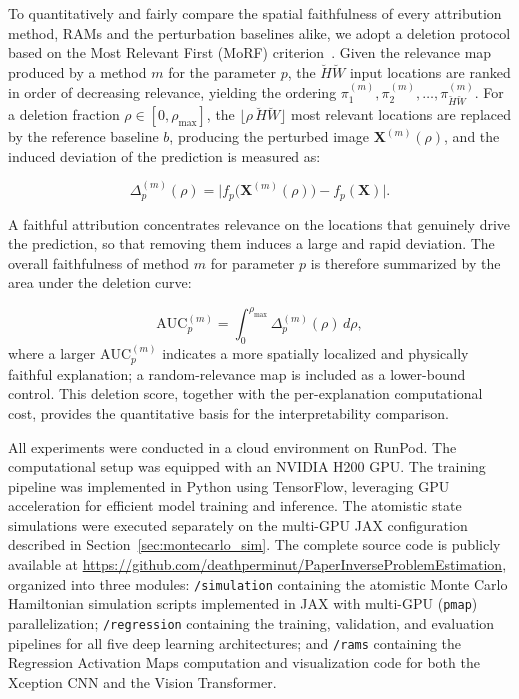 \documentclass[final,5p,times,twocolumn]{elsarticle}
\begin{document}
To quantitatively and fairly compare the spatial faithfulness of every attribution method, RAMs and the perturbation baselines alike, we adopt a deletion protocol based on the Most Relevant First (MoRF) criterion~\cite{samek2017evaluating}. Given the relevance map produced by a method $m$ for the parameter $p$, the $\breve{H}\breve{W}$ input locations are ranked in order of decreasing relevance, yielding the ordering $\pi_1^{(m)}, \pi_2^{(m)}, \dots, \pi_{\breve{H}\breve{W}}^{(m)}$. For a deletion fraction $\rho \in [0, \rho_{\max}]$, the $\lfloor \rho\,\breve{H}\breve{W} \rfloor$ most relevant locations are replaced by the reference baseline $b$, producing the perturbed image $\mathbf{X}^{(m)}(\rho)$, and the induced deviation of the prediction is measured as:

\begin{equation}\label{eq:deletion_dev}
\Delta_p^{(m)}(\rho) = \big| f_p\big(\mathbf{X}^{(m)}(\rho)\big) - f_p(\mathbf{X}) \big|.
\end{equation}

A faithful attribution concentrates relevance on the locations that genuinely drive the prediction, so that removing them induces a large and rapid deviation. The overall faithfulness of method $m$ for parameter $p$ is therefore summarized by the area under the deletion curve:

\begin{equation}\label{eq:deletion_auc}
\text{AUC}_p^{(m)} = \int_0^{\rho_{\max}} \Delta_p^{(m)}(\rho)\, d\rho,
\end{equation}
where a larger $\text{AUC}_p^{(m)}$ indicates a more spatially localized and physically faithful explanation; a random-relevance map is included as a lower-bound control. This deletion score, together with the per-explanation computational cost, provides the quantitative basis for the interpretability comparison.


All experiments were conducted in a cloud environment on RunPod. The computational 
setup was equipped with an NVIDIA H200 GPU. The training 
pipeline was implemented in Python using TensorFlow, 
leveraging GPU acceleration for efficient model training and inference. The atomistic state simulations were executed separately on the multi-GPU JAX configuration described in Section~\ref{sec:montecarlo_sim}. The complete source code 
is publicly available at 
\url{https://github.com/deathperminut/PaperInverseProblemEstimation}, 
organized into three modules: 
\texttt{/simulation} containing the atomistic 
Monte Carlo Hamiltonian simulation scripts 
implemented in JAX with multi-GPU (\texttt{pmap}) parallelization; \texttt{/regression} containing 
the training, validation, and evaluation pipelines
for all five deep learning architectures; and
\texttt{/rams} containing the Regression Activation 
Maps computation and visualization code for both 
the Xception CNN and the Vision Transformer.
\end{document}
